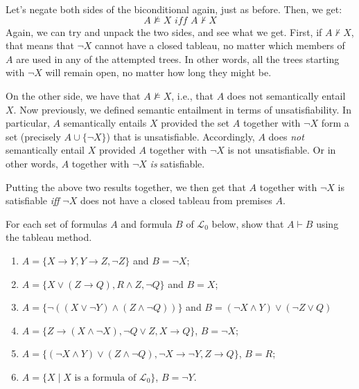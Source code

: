 Let's negate both sides of the biconditional again, just as before. Then, we get: 
%
\[
A \not\models X \textit{ iff } A \nvdash X
\] 
%
Again, we can try and unpack the two sides, and see what we get. First, if $A \nvdash X$, that means that $\neg X$ cannot have a closed tableau, no matter which members of $A$ are used in any of the attempted trees. In other words, all the trees starting with $\neg X$ will remain open, no matter how long they might be. 

On the other side, we have that $A \not\models X$, i.e., that $A$ does not semantically entail $X$. Now previously, we defined semantic entailment in terms of unsatisfiability. In particular, $A$ semantically entails $X$ provided the set $A$ together with $\neg X$ form a set (precisely $A \cup \{\neg X\}$) that is unsatisfiable. Accordingly, $A$ does \textit{not} semantically entail $X$ provided $A$ together with $\neg X$ is not unsatisfiable. Or in other words, $A$ together with $\neg X$ \textit{is} satisfiable.

Putting the above two results together, we then get that $A$ together with $\neg X$ is satisfiable \textit{iff} $\neg X$ does not have a closed tableau from premises $A$. 

\begin{exc}
For each set of formulas $A$ and formula $B$ of $\mathcal{L}_0$ below, show that $A \vdash B$ using the tableau method. 

\begin{enumerate}
	\item $A=\{X \rightarrow Y, Y \rightarrow Z, \neg Z\}$ and $B=\neg X$;
	\item $A=\{X \vee (Z \rightarrow Q), R \wedge Z, \neg Q\}$ and $B=X$;
	\item $A=\{\neg ((X \vee \neg Y) \wedge (Z \wedge \neg Q))\}$ and $B=(\neg X \wedge Y) \vee (\neg Z \vee Q)$
	\item $A=\{Z \rightarrow (X \wedge \neg X), \neg Q \vee Z, X \rightarrow Q\}$, $B=\neg X$;
	\item $A=\{(\neg X \wedge Y) \vee (Z \wedge \neg Q), \neg X \rightarrow \neg Y, Z \rightarrow Q\}$, $B=R$;
	\item $A=\{X \mid X\text{ is a formula of }\mathcal{L}_0\}$, $B=\neg Y$.
	\end{enumerate} 
\end{exc}
